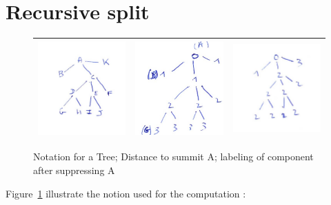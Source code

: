 \documentclass[a4paper]{article}
\begin{document}
\section{Recursive split}
\begin{figure}
\centering
\begin{tabular}{||c|c|c||}
 \hline \hline
\includegraphics[width=5cm]{FIGS/FTD-Tree.jpg} &
\includegraphics[width=5cm]{FIGS/FTD-Depth.jpg} &
\includegraphics[width=5cm]{FIGS/FTD-LabSplit.jpg}
 \\ \hline \hline
\end{tabular}
\caption{Notation for a Tree; Distance to summit A; labeling of component after suppressing A}
\label{TreeNotation}
\end{figure}

Figure~\ref{TreeNotation} illustrate the notion used for the computation :
\end{document}

